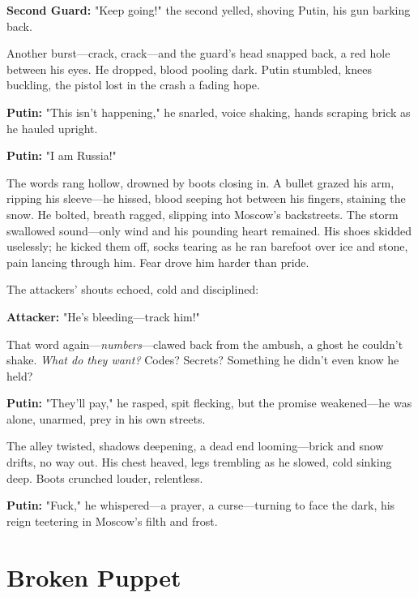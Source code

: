 \documentclass[12pt]{book}
\begin{document}
\vspace{0.5em}
\textbf{Second Guard:} "Keep going!" the second yelled, shoving Putin, his gun barking back.

Another burst—crack, crack—and the guard’s head snapped back, a red hole between his eyes. He dropped, blood pooling dark. Putin stumbled, knees buckling, the pistol lost in the crash a fading hope.

\vspace{0.5em}
\textbf{Putin:} "This isn’t happening," he snarled, voice shaking, hands scraping brick as he hauled upright.

\vspace{0.5em}
\textbf{Putin:} "I am Russia!"

The words rang hollow, drowned by boots closing in. A bullet grazed his arm, ripping his sleeve—he hissed, blood seeping hot between his fingers, staining the snow. He bolted, breath ragged, slipping into Moscow’s backstreets. The storm swallowed sound—only wind and his pounding heart remained. His shoes skidded uselessly; he kicked them off, socks tearing as he ran barefoot over ice and stone, pain lancing through him. Fear drove him harder than pride.

The attackers’ shouts echoed, cold and disciplined:

\vspace{0.5em}
\textbf{Attacker:} "He’s bleeding—track him!"

That word again—\emph{numbers}—clawed back from the ambush, a ghost he couldn’t shake. \emph{What do they want?} Codes? Secrets? Something he didn’t even know he held?

\vspace{0.5em}
\textbf{Putin:} "They’ll pay," he rasped, spit flecking, but the promise weakened—he was alone, unarmed, prey in his own streets.

The alley twisted, shadows deepening, a dead end looming—brick and snow drifts, no way out. His chest heaved, legs trembling as he slowed, cold sinking deep. Boots crunched louder, relentless.

\vspace{0.5em}
\textbf{Putin:} "Fuck," he whispered—a prayer, a curse—turning to face the dark, his reign teetering in Moscow’s filth and frost.

\vspace{1em}

\section{Broken Puppet}
\end{document}
